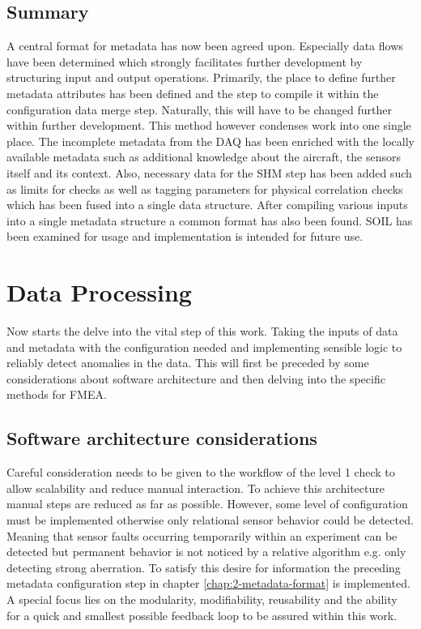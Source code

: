 \subsection{Summary}
A central format for metadata has now been agreed upon. Especially data flows have been determined which strongly facilitates further development by structuring input and output operations. Primarily, the place to define further metadata attributes has been defined and the step to compile it within the configuration data merge step. Naturally, this will have to be changed further within further development. This method however condenses work into one single place.
The incomplete metadata from the DAQ has been enriched with the locally available metadata such as additional knowledge about the aircraft, the sensors itself and its context. Also, necessary data for the SHM step has been added such as limits for checks as well as tagging parameters for physical correlation checks which has been fused into a single data structure.
After compiling various inputs into a single metadata structure a common format has also been found. SOIL has been examined for usage and implementation is intended for future use.

\newpage


\section{Data Processing}
Now starts the delve into the vital step of this work. Taking the inputs of data and metadata with the configuration needed and implementing sensible logic to reliably detect anomalies in the data. This will first be preceded by some considerations about software architecture and then delving into the specific methods for FMEA.

\subsection{Software architecture considerations}


Careful consideration needs to be given to the workflow of the level 1 check to allow scalability and reduce manual interaction. To achieve this architecture manual steps are reduced as far as possible. However, some level of configuration must be implemented otherwise only relational sensor behavior could be detected. Meaning that sensor faults occurring temporarily within an experiment can be detected but permanent behavior is not noticed by a relative algorithm e.g. only detecting strong aberration. To satisfy this desire for information the preceding metadata configuration step in chapter \ref{chap:2-metadata-format} is implemented. A special focus lies on the modularity, modifiability, reusability and the ability for a quick and smallest possible feedback loop to be assured within this work.

